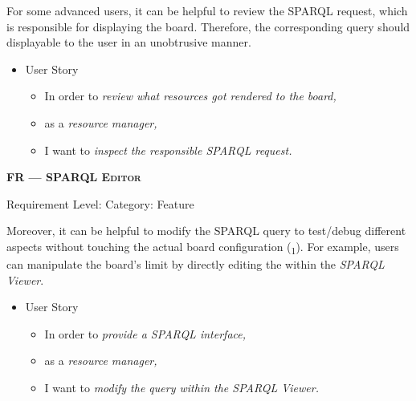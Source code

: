 \noindent For some advanced users, it can be helpful to review the \acrshort*{SPARQL} request, which is responsible for displaying the board. Therefore, the corresponding query should displayable to the user in an unobtrusive manner.


\begin{itemize}[after=\vspace{1em}]
    \setlength\itemsep{-0.5em}
	\item[] User Story\\[-7.8mm]
	\begin{itemize}
    \setlength\itemsep{-0.5em}
        \item[] In order to \textit{review what resources got rendered to the board,}
        \item[] as a \textit{resource manager,}
        \item[] I want to \textit{inspect the responsible \acrshort*{SPARQL} request.}
    \end{itemize}
\end{itemize}



\centerline{\textbf{FR\textsubscript{} --- \textsc{\acrshort*{SPARQL} Editor}}}
\centerline{\small Requirement Level:  \quad{} Category: Feature}

\noindent Moreover, it can be helpful to modify the \acrshort*{SPARQL} query to test/debug different aspects without touching the actual board configuration (\textsubscript{1}). For example, users can manipulate the board’s limit by directly editing the   within the \textit{\acrshort*{SPARQL} Viewer}.

\begin{itemize}[after=\vspace{1em}]
    \setlength\itemsep{-0.5em}
	\item[] User Story\\[-7.8mm]
	\begin{itemize}
    \setlength\itemsep{-0.5em}
        \item[] In order to \textit{provide a \acrshort*{SPARQL} interface,}
        \item[] as a \textit{resource manager,}
        \item[] I want to \textit{modify the query within the \textit{\acrshort*{SPARQL} Viewer}.}
    \end{itemize}
\end{itemize}






